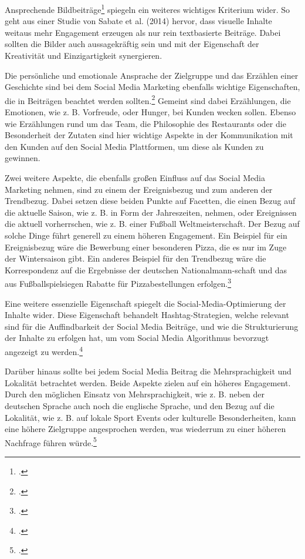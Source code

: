 Ansprechende Bildbeiträge\footcite{davidson_social_media} spiegeln ein weiteres wichtiges Kriterium wider.
So geht aus einer Studie von Sabate et al. (2014) hervor, dass visuelle Inhalte weitaus mehr Engagement erzeugen als nur rein textbasierte Beiträge.
Dabei sollten die Bilder auch aussagekräftig sein und mit der Eigenschaft der Kreativität und Einzigartigkeit synergieren.

Die persönliche und emotionale Ansprache der Zielgruppe und das Erzählen einer Geschichte sind bei dem Social Media Marketing ebenfalls wichtige Eigenschaften, die in Beiträgen beachtet werden sollten.\footcite{book}
Gemeint sind dabei Erzählungen, die Emotionen, wie z. B. Vorfreude, oder Hunger, bei Kunden wecken sollen.
Ebenso wie Erzählungen rund um das Team, die Philosophie des Restaurants oder die Besonderheit der Zutaten sind hier wichtige Aspekte in der Kommunikation mit den Kunden auf den Social Media Plattformen, um diese als Kunden zu gewinnen.

Zwei weitere Aspekte, die ebenfalls großen Einfluss auf das Social Media Marketing nehmen, sind zu einem der Ereignisbezug und zum anderen der Trendbezug.
Dabei setzen diese beiden Punkte auf Facetten, die einen Bezug auf die aktuelle Saison, wie z. B. in Form der Jahreszeiten, nehmen, oder Ereignissen die aktuell vorherrschen, wie z. B. einer Fußball Weltmeisterschaft.
Der Bezug auf solche Dinge führt generell zu einem höheren Engagement. Ein Beispiel für ein Ereignisbezug wäre die Bewerbung einer besonderen Pizza, die es nur im Zuge der Wintersaison gibt.
Ein anderes Beispiel für den Trendbezug wäre die Korrespondenz auf die Ergebnisse der deutschen Nationalmann-schaft und das aus Fußballspielsiegen Rabatte für Pizzabestellungen erfolgen.\footcite{inbook}

Eine weitere essenzielle Eigenschaft spiegelt die Social-Media-Optimierung der Inhalte wider.
Diese Eigenschaft behandelt Hashtag-Strategien, welche relevant sind für die Auffindbarkeit der Social Media Beiträge, und wie die Strukturierung der Inhalte zu erfolgen hat, um vom Social Media Algorithmus bevorzugt angezeigt zu werden.\footcite{social_media_marketing}

Darüber hinaus sollte bei jedem Social Media Beitrag die Mehrsprachigkeit und Lokalität betrachtet werden.
Beide Aspekte zielen auf ein höheres Engagement.
Durch den möglichen Einsatz von Mehrsprachigkeit, wie z. B. neben der deutschen Sprache auch noch die englische Sprache, und den Bezug auf die Lokalität, wie z. B. auf lokale Sport Events oder kulturelle Besonderheiten, kann eine höhere Zielgruppe angesprochen werden, was wiederrum zu einer höheren Nachfrage führen würde.\footcite{global_marketing_advertising}

